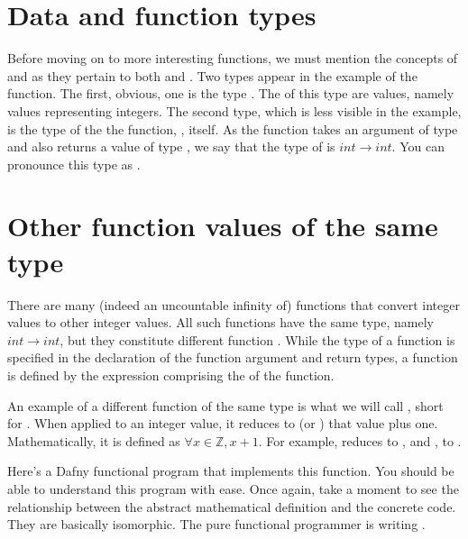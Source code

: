 \documentclass[letterpaper,10pt,english]{sphinxmanual}
\begin{document}
\section{Data and function types}
\label{\detokenize{04-runnable-math:data-and-function-types}}
Before moving on to more interesting functions, we must mention the
concepts of  and  as they pertain to both  and
. Two types appear in the example of the  function. The
first, obvious, one is the type . The  of this type are
 values, namely values representing integers. The second type,
which is less visible in the example, is the type of the the function,
, itself. As the function takes an argument of type  and also
returns a value of type , we say that the type of  is
\(int \rightarrow int\). You can pronounce this type as .


\section{Other function values of the same type}
\label{\detokenize{04-runnable-math:other-function-values-of-the-same-type}}
There are many (indeed an uncountable infinity of) functions that
convert integer values to other integer values. All such functions
have the same type, namely \(int \rightarrow int\), but they
constitute different function . While the type of a function
is specified in the declaration of the function argument and return
types, a function  is defined by the expression comprising the
 of the function.

An example of a different function of the same type is what we will
call , short for . When applied to an integer value,
it reduces to (or ) that value plus one. Mathematically, it
is defined as \(\forall x \in {\mathbb Z}, x + 1\). For example,
 reduces to , and , to .

Here’s a Dafny functional program that implements this function. You
should be able to understand this program with ease. Once again, take
a moment to see the relationship between the abstract mathematical
definition and the concrete code. They are basically isomorphic. The
pure functional programmer is writing .
\end{document}
